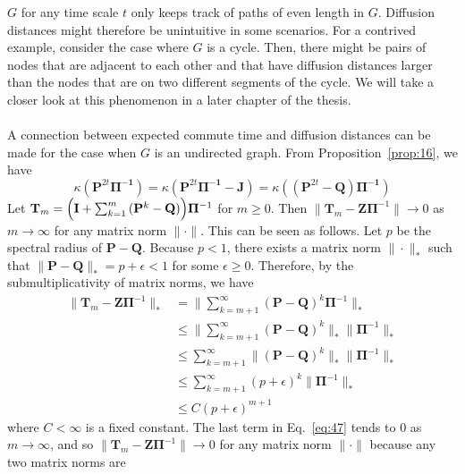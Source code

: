 $G$ for any time scale $t$ only keeps track of paths of even length
in $G$. Diffusion distances might therefore be unintuitive in some
scenarios. For a contrived example, consider the case where $G$ is a
cycle. Then, there might be pairs of nodes that are adjacent to each
other and that have diffusion distances larger than the nodes that are
on two different segments of the cycle. We will take a closer look at
this phenomenon in a later chapter of the
thesis. \\ \\
%
\noindent
A connection between expected commute time and diffusion distances can
be made for the case when $G$ is an undirected graph. From Proposition~\ref{prop:16}, we have
\begin{equation}
  \label{eq:49}
\kappa(\mathbf{P}^{2t}\bm{\Pi^{-1}}) =
\kappa(\mathbf{P}^{2t}\bm{\Pi^{-1}} - \mathbf{J}) =
\kappa((\mathbf{P}^{2t} - \mathbf{Q}) \bm{\Pi^{-1}})
\end{equation}
Let $\mathbf{T}_{m} = \Bigl(\mathbf{I} + \sum_{k =
  1}^{m}{(\mathbf{P}^{k} - \mathbf{Q})}\Bigr)\bm{\Pi}^{-1}$ for $m
\geq 0$. Then $\| \mathbf{T}_m - \mathbf{Z}\bm{\Pi}^{-1} \|
\rightarrow 0$ as $m \rightarrow \infty$ for any matrix norm $\| \cdot
\|$. This can be seen as follows.  Let $p$ be the spectral radius of
$\mathbf{P} - \mathbf{Q}$. Because $p < 1$, there exists a matrix norm
$\| \cdot \|_*$ such that $\| \mathbf{P} - \mathbf{Q} \|_* = p +
\epsilon < 1$ for some $\epsilon \geq 0$. Therefore, by the
submultiplicativity of matrix norms, we have
\begin{equation}
  \label{eq:47}
  \begin{split}
  \| \mathbf{T}_m - \mathbf{Z}\bm{\Pi}^{-1} \|_* &=
  \|\sum_{k=m+1}^{\infty}(\mathbf{P} - \mathbf{Q})^{k}\bm{\Pi}^{-1}
    \|_* \\
   &\leq \| \sum_{k=m+1}^{\infty}(\mathbf{P} - \mathbf{Q})^{k} \|_*
   \|\bm{\Pi}^{-1} \|_* \\
   &\leq \sum_{k=m+1}^{\infty} \|(\mathbf{P} - \mathbf{Q})^{k} \|_*
   \|\bm{\Pi}^{-1} \|_* \\
   &\leq \sum_{k=m+1}^{\infty} (p+\epsilon)^{k} \| \bm{\Pi}^{-1} \|_* \\
   &\leq C (p+\epsilon)^{m+1}
  \end{split}
\end{equation}
where $C < \infty$ is a fixed constant. The last term in
Eq.~\eqref{eq:47} tends to $0$ as $m \rightarrow \infty$, and so $\|
\mathbf{T}_m - \mathbf{Z}\bm{\Pi}^{-1} \| \rightarrow 0$ for any
matrix norm $\| \cdot \|$ because any two matrix norms are
